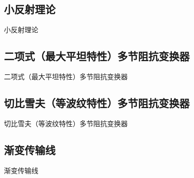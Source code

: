 \subsection{小反射理论}
\begin{frame}{小反射理论}

\end{frame}

\subsection{二项式（最大平坦特性）多节阻抗变换器}
\begin{frame}{二项式（最大平坦特性）多节阻抗变换器}

\end{frame}

\subsection{切比雪夫（等波纹特性）多节阻抗变换器}
\begin{frame}{切比雪夫（等波纹特性）多节阻抗变换器}

\end{frame}

\subsection{渐变传输线}
\begin{frame}{渐变传输线}

\end{frame}
